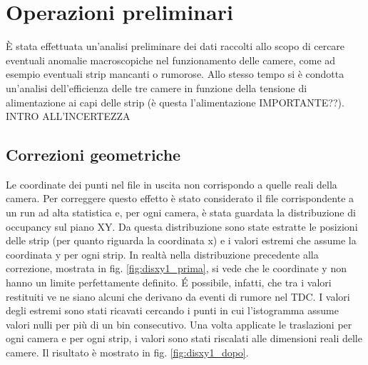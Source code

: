 \documentclass[8pt]{extarticle}
\begin{document}
\section{Operazioni preliminari}
È stata effettuata un’analisi preliminare dei dati raccolti allo scopo di cercare eventuali anomalie macroscopiche nel funzionamento delle camere, come ad esempio eventuali strip mancanti o rumorose. Allo stesso tempo si è condotta un'analisi dell'efficienza delle tre camere in funzione della tensione di alimentazione ai capi delle strip (è questa l'alimentazione IMPORTANTE??). INTRO ALL'INCERTEZZA

\subsection{Correzioni geometriche}
Le coordinate dei punti nel file in uscita non corrispondo a quelle reali della camera. Per correggere questo effetto è stato considerato il file corrispondente a un run ad alta statistica e, per ogni camera, è stata guardata la distribuzione di occupancy sul piano XY. Da questa distribuzione sono state estratte le posizioni delle strip (per quanto riguarda la coordinata x) e i valori estremi che assume la coordinata y per ogni strip. In realtà nella distribuzione precedente alla correzione, mostrata in fig. \ref{fig:disxy1_prima}, si vede che le coordinate y non hanno un limite perfettamente definito. \'E possibile, infatti, che tra i valori restituiti ve ne siano alcuni che derivano da eventi di rumore nel TDC. I valori degli estremi sono stati ricavati cercando i punti in cui l'istogramma assume valori nulli per più di un bin consecutivo. Una volta applicate le traslazioni per ogni camera e per ogni strip, i valori sono stati riscalati alle dimensioni reali delle camere. Il risultato è mostrato in fig. \ref{fig:disxy1_dopo}.
\end{document}
